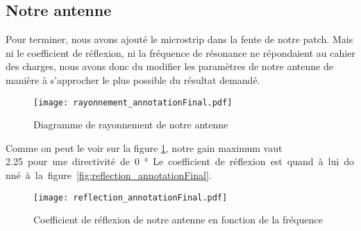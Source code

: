 \subsection{Notre antenne}
Pour terminer, nous avons ajouté le microstrip dans la fente de notre patch. Mais ni le coefficient de réflexion, ni la fréquence de résonance ne répondaient au cahier des charges, nous avons donc du modifier les paramètres de notre antenne de manière à s'approcher le plus possible du résultat demandé.
\begin{figure}[htbp]
\centering
\texttt{[image: rayonnement\_annotationFinal.pdf]}
\caption{Diagramme de rayonnement de notre antenne}
\label{fig:rayonnement_annotationFinal}
\end{figure}
Comme on peut le voir sur la figure \ref{fig:rayonnement_annotationFinal}, notre gain maximum vaut \SI{2.25} pour une directivité de \SI{0}{\degree}. Le coefficient de réflexion est quand à lui donné à la figure \ref{fig:reflection_annotationFinal}.
\begin{figure}[htbp]
\centering
\texttt{[image: reflection\_annotationFinal.pdf]}
\caption{Coefficient de réflexion de notre antenne en fonction de la fréquence}
\label{fig:reflection1_annotationFinal}
\end{figure}


